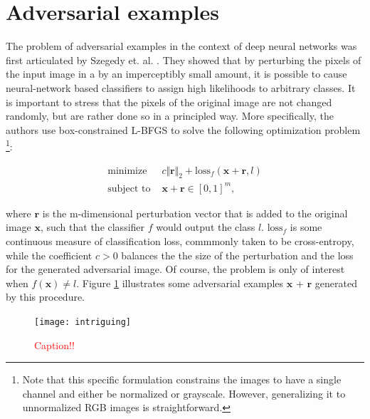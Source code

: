 \documentclass{report}
\newcommand\todo[1]{\textcolor{red}{#1}}
\begin{document}
\section{Adversarial examples}

\noindent The problem of adversarial examples in the context of deep neural networks was first articulated by Szegedy et. al. \cite{intriguing-properties}. They showed that by perturbing the pixels of the input image in a by an imperceptibly small amount, it is possible to cause neural-network based classifiers to assign high likelihoods to arbitrary classes. It is important to stress that the pixels of the original image are not changed randomly, but are rather done so in a principled way. More specifically, the authors use box-constrained L-BFGS \cite{NoceWrig06} to solve the following optimization problem \footnote{Note that this specific formulation constrains the images to have a single channel and either be normalized or grayscale. However, generalizing it to unnormalized RGB images is straightforward.}:

\begin{equation}
\begin{aligned}
\text{minimize } &c \Vert \boldsymbol{r} \Vert_2 + \text{loss}_f(\boldsymbol{x}+\boldsymbol{r}, l) \\
\text{subject to } &\boldsymbol{x} + \boldsymbol{r} \in [0, 1]^m,
\end{aligned}
\end{equation}

\bigskip

\noindent where $\boldsymbol{r}$ is the m-dimensional perturbation vector that is added to the original image $\boldsymbol{x}$, such that the classifier $f$ would output the class $l$. $\text{loss}_f$ is some continuous measure of classification loss, commmonly taken to be cross-entropy, while the coefficient $c > 0$ balances the the size of the perturbation and the loss for the generated adversarial image. Of course, the problem is only of interest when $f(\boldsymbol{x}) \neq l$. Figure \ref{fig:intriguing} illustrates some adversarial examples $\boldsymbol{x}$ + $\boldsymbol{r}$ generated by this procedure.

\begin{figure}
\begin{center}
\texttt{[image: intriguing]}
\caption{\todo{Caption!!}}
\label{fig:intriguing}
\end{center}
\end{figure}
\end{document}
